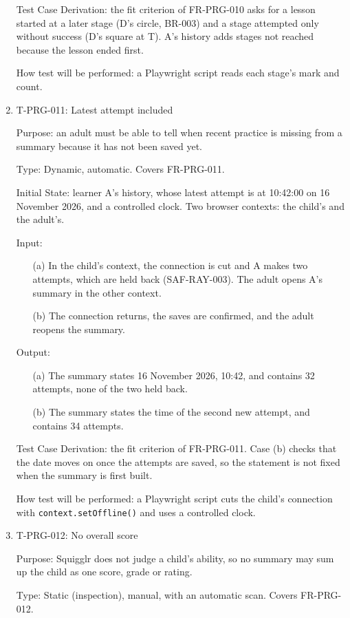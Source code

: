 \documentclass[12pt, titlepage]{article}
\newcommand{\testitem}[1]{\item #1\par\nopagebreak}
\begin{document}
\begin{enumerate}
Test Case Derivation: the fit criterion of FR-PRG-010 asks for a lesson
started at a later stage (D's circle, BR-003) and a stage attempted only
without success (D's square at T). A's history adds stages not reached
because the lesson ended first.

How test will be performed: a Playwright script reads each stage's mark and
count.

\testitem{T-PRG-011: Latest attempt included}

Purpose: an adult must be able to tell when recent practice is missing from
a summary because it has not been saved yet.

Type: Dynamic, automatic. Covers FR-PRG-011.

Initial State: learner A's history, whose latest attempt is at 10:42:00 on
16 November 2026, and a controlled clock. Two browser contexts: the child's
and the adult's.

Input:
\begin{itemize}
\item[(a)] In the child's context, the connection is cut and A makes two
attempts, which are held back (SAF-RAY-003). The adult opens A's summary in
the other context.
\item[(b)] The connection returns, the saves are confirmed, and the adult
reopens the summary.
\end{itemize}

Output:
\begin{itemize}
\item[(a)] The summary states 16 November 2026, 10:42, and contains 32
attempts, none of the two held back.
\item[(b)] The summary states the time of the second new attempt, and
contains 34 attempts.
\end{itemize}

Test Case Derivation: the fit criterion of FR-PRG-011. Case (b) checks that
the date moves on once the attempts are saved, so the statement is not
fixed when the summary is first built.

How test will be performed: a Playwright script cuts the child's
connection with \texttt{context.setOffline()} and uses a controlled clock.

\testitem{T-PRG-012: No overall score}

Purpose: Squigglr does not judge a child's ability, so no summary may sum
up the child as one score, grade or rating.

Type: Static (inspection), manual, with an automatic scan. Covers
FR-PRG-012.


\end{enumerate}
\end{document}
